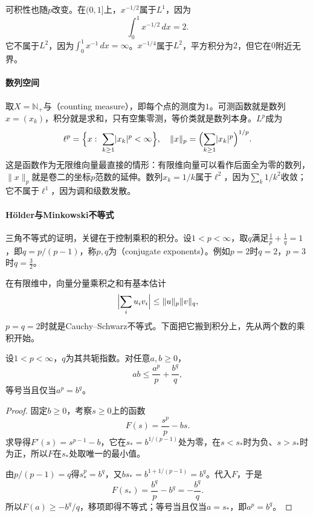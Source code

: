 可积性也随$p$改变。在$(0,1]$上，$x^{-1/2}$属于$L^1$，因为
\[
 \int_0^1x^{-1/2}\,dx=2.
\]
它不属于$L^2$，因为$\int_0^1x^{-1}\,dx=\infty$。$x^{-1/4}$属于$L^2$，平方积分为$2$，但它在$0$附近无界。

\paragraph{数列空间}
取$X=\mathbb N_+$与（counting measure），即每个点的测度为$1$。可测函数就是数列$x=(x_k)$，积分就是求和，只有空集零测，等价类就是数列本身。$L^p$成为
\begin{equation}
 \ell^p=\Bigl\{x:\ \sum_{k\geq1}\lvert x_k\rvert^p<\infty\Bigr\},\quad \lVert x\rVert_p=\Bigl(\sum_{k\geq1}\lvert x_k\rvert^p\Bigr)^{1/p}.
 \label{eq:nspace-ellp}
\end{equation}
这是函数作为无限维向量最直接的情形：有限维向量可以看作后面全为零的数列，$\lVert x\rVert_p$就是卷二的坐标$p$范数的延伸。数列$x_k=1/k$属于$\ell^2$，因为$\sum_k1/k^2$收敛；它不属于$\ell^1$，因为调和级数发散。

\paragraph{Hölder与Minkowski不等式}
三角不等式的证明，关键在于控制乘积的积分。设$1<p<\infty$，取$q$满足$\tfrac1p+\tfrac1q=1$，即$q=p/(p-1)$，称$p,q$为（conjugate exponents）。例如$p=2$时$q=2$，$p=3$时$q=\tfrac32$。

在有限维中，向量分量乘积之和有基本估计
\[
 \Bigl\lvert\sum_iu_iv_i\Bigr\rvert\leq\lVert u\rVert_p\lVert v\rVert_q,
\]
$p=q=2$时就是Cauchy--Schwarz不等式。下面把它搬到积分上，先从两个数的乘积开始。

\begin{lemma}[Young不等式]
\label{lem:nspace-young}
设$1<p<\infty$，$q$为其共轭指数。对任意$a,b\geq0$，
\begin{equation}
 ab\leq\frac{a^p}{p}+\frac{b^q}{q},
 \label{eq:nspace-young}
\end{equation}
等号当且仅当$a^p=b^q$。
\end{lemma}

\begin{proof}
固定$b\geq0$，考察$s\geq0$上的函数
\[
 F(s)=\frac{s^p}{p}-bs.
\]
求导得$F'(s)=s^{p-1}-b$，它在$s_*=b^{1/(p-1)}$处为零，在$s<s_*$时为负、$s>s_*$时为正，所以$F$在$s_*$处取唯一的最小值。

由$p/(p-1)=q$得$s_*^p=b^q$，又$bs_*=b^{1+1/(p-1)}=b^q$。代入$F$，于是
\[
 F(s_*)=\frac{b^q}{p}-b^q=-\frac{b^q}{q}.
\]
所以$F(a)\geq-b^q/q$，移项即得不等式；等号当且仅当$a=s_*$，即$a^p=b^q$。
\end{proof}

